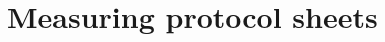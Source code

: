 \newpage
\appendix
\appendixpage
\renewcommand{\sectionautorefname}{Appendix}
\section{Measuring protocol sheets}
\label{app:sheet}

\setcounter{pdfpage}{0}

\newcommand{\addpdfpages}[2]{
}

\addpdfpages{part1-noEve.pdf}{subapp:sheetpg:}

\addpdfpages{part1-Eve.pdf}{subapp:sheetpg:}

\addpdfpages{part2-noEve.pdf}{subapp:sheetpg:}

\addpdfpages{part2-Eve.pdf}{subapp:sheetpg:}